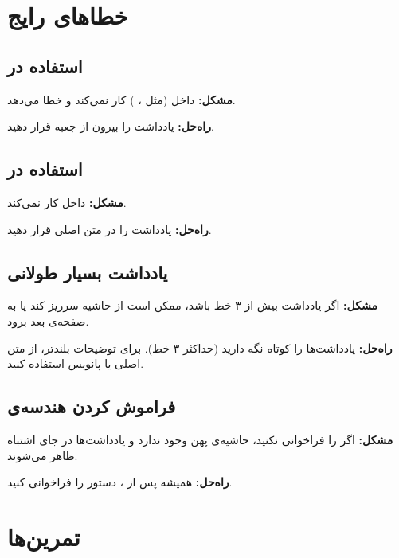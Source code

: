 
\section{خطاهای رایج}
\label{sec:margin-notes-mistakes}

\subsection{استفاده در }
\label{sec:margin-notes-mistake-tcolorbox}

\textbf{مشکل:}  داخل 
(مثل ، ) کار نمی‌کند
و خطا می‌دهد.

\textbf{راه‌حل:} یادداشت را بیرون از جعبه قرار
دهید.

\subsection{استفاده در }
\label{sec:margin-notes-mistake-figure}

\textbf{مشکل:}  داخل  کار
نمی‌کند.

\textbf{راه‌حل:} یادداشت را در متن اصلی قرار
دهید.

\subsection{یادداشت بسیار طولانی}
\label{sec:margin-notes-mistake-long}

\textbf{مشکل:} اگر یادداشت بیش از ۳ خط باشد،
ممکن است از حاشیه سرریز کند یا به صفحه‌ی بعد
برود.

\textbf{راه‌حل:} یادداشت‌ها را کوتاه نگه دارید
(حداکثر ۳ خط). برای توضیحات بلندتر، از متن اصلی
یا پانویس استفاده کنید.

\subsection{فراموش کردن هندسه‌ی }
\label{sec:margin-notes-mistake-geometry}

\textbf{مشکل:} اگر  را
فراخوانی نکنید، حاشیه‌ی پهن وجود ندارد و
یادداشت‌ها در جای اشتباه ظاهر می‌شوند.

\textbf{راه‌حل:} همیشه پس از ،
دستور  را فراخوانی کنید.

\section{تمرین‌ها}
\label{sec:margin-notes-exercises}

